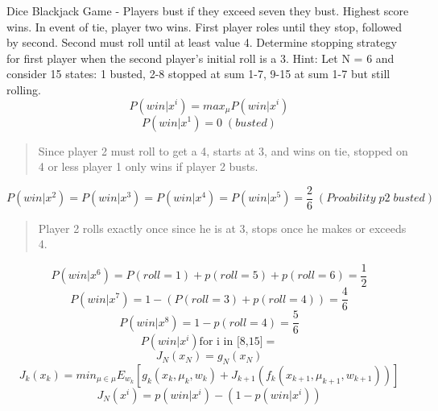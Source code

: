 \documentclass[11pt]{article}
\newenvironment{problem}[2][Problem]{\begin{trivlist}
\item[\hskip \labelsep {\bfseries #1}\hskip \labelsep {\bfseries #2.}]}{\end{trivlist}}
\begin{document}
\begin{problem}{4} Dice Blackjack Game - Players bust if they exceed seven they bust. Highest score wins. In event of tie, player two wins. First player roles until they stop, followed by second. Second must roll until at least value 4. Determine stopping strategy for first player when the second player's initial roll is a 3. Hint: Let N = 6 and consider 15 states: 1 busted, 2-8 stopped at sum 1-7, 9-15 at sum 1-7 but still rolling.
	\begin{equation}
		P(win | x^i) = max_{\mu} P(win | x^i)
	\end{equation}
	\begin{equation}
		P(win | x^1) = 0 \; (busted)
	\end{equation}
	\begin{verse}
		Since player 2 must roll to get a 4, starts at 3, and wins on tie, stopped on 4 or less player 1 only wins if player 2 busts.
	\end{verse}
	\begin{equation}
		P(win | x^2) = P(win | x^3) = P(win | x^4 ) = P(win | x^5) = \frac{2}{6} \; (Proability\;p2\;busted)
	\end{equation}
	\begin{verse}
		Player 2 rolls exactly once since he is at 3, stops once he makes or exceeds 4.
	\end{verse}
	\begin{equation}
		P(win | x^6) = P(roll = 1) + p(roll = 5) + p(roll = 6) = \frac{1}{2}
	\end{equation}
	\begin{equation}
		P(win | x^7) = 1 - (P(roll = 3) + p(roll = 4)) = \frac{4}{6}
	\end{equation}
	\begin{equation}
		P(win | x^8) = 1 - p(roll = 4) = \frac{5}{6}
	\end{equation}
	\begin{equation}
		P(win | x^i) \text{for i in [8,15]} = 
	\end{equation}
	\begin{equation}
		J_N(x_N) = g_N(x_N)
	\end{equation}
	\begin{equation}
		J_k(x_k) = min_{\mu \in \mu} E_{w_k} \left[ g_k ( x_k, \mu_k, w_k) + J_{k+1} ( f_k ( x_{k+1}, \mu_{k+1}, w_{k+1} ) ) \right]
	\end{equation}
	\begin{equation}
		J_N(x^i) = p(win | x^i) - (1 - p(win | x^i))
	\end{equation}
	\begin{itemize}
	

\end{itemize}
\end{problem}
\end{document}
